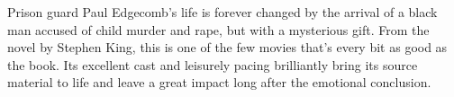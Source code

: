    Prison guard Paul Edgecomb's life is forever changed by the arrival of a black man accused of child murder and rape, but with a mysterious gift. From the novel by Stephen King, this is one of the few movies that's every bit as good as the book. Its excellent cast and leisurely pacing brilliantly bring its source material to life and leave a great impact long after the emotional conclusion. \author{DW} 
